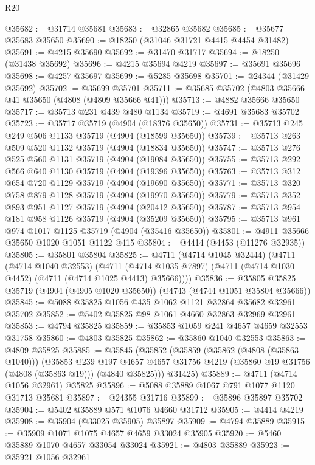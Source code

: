 \begin{lexlean}{R20}
\begin{coremodule}
@35682 := @31714 @35681
@35683 := @32865 @35682
@35685 := @35677 @35683 @35650
@35690 := @18250 (@31046 @31721 @4415 @4454 @31482)
@35691 := @4215 @35690
@35692 := @31470 @31717
@35694 := @18250 (@31438 @35692)
@35696 := @4215 @35694 @4219
@35697 := @35691 @35696
@35698 := @4257 @35697
@35699 := @5285 @35698
@35701 := @24344 (@31429 @35692)
@35702 := @35699 @35701
@35711 := @35685 @35702 (@4803 @35666 @41 @35650 (@4808 (@4809 @35666 @41)))
@35713 := @4882 @35666 @35650
@35717 := @35713 @231 @439 @480 @1134
@35719 := @4691 @35683 @35702
@35723 := @35717 @35719 (@4904 (@18376 @35650))
@35731 := @35713 @245 @249 @506 @1133 @35719 (@4904 (@18599 @35650))
@35739 := @35713 @263 @509 @520 @1132 @35719 (@4904 (@18834 @35650))
@35747 := @35713 @276 @525 @560 @1131 @35719 (@4904 (@19084 @35650))
@35755 := @35713 @292 @566 @640 @1130 @35719 (@4904 (@19396 @35650))
@35763 := @35713 @312 @654 @720 @1129 @35719 (@4904 (@19690 @35650))
@35771 := @35713 @320 @758 @879 @1128 @35719 (@4904 (@19970 @35650))
@35779 := @35713 @352 @893 @951 @1127 @35719 (@4904 (@20412 @35650))
@35787 := @35713 @954 @181 @958 @1126 @35719 (@4904 (@35209 @35650))
@35795 := @35713 @961 @974 @1017 @1125 @35719 (@4904 (@35416 @35650))
@35801 := @4911 @35666 @35650 @1020 @1051 @1122 @415
@35804 := @4414 (@4453 (@11276 @32935))
@35805 := @35801 @35804
@35825 := @4711
    (@4714 @1045 @32444)
    (@4711
      (@4714 @1040 @32553)
      (@4711 (@4714 @1035 @7897) (@4711 (@4714 @1030 @4452) (@4711 (@4714 @1025 @4413) @35666))))
@35836 := @35805 @35825 @35719 (@4904 (@4905 @1020 @35650)) (@4743 (@4744 @1051 @35804 @35666))
@35845 := @5088 @35825 @1056 @435 @1062 @1121 @32864 @35682 @32961 @35702
@35852 := @5402 @35825 @98 @1061 @4660 @32863 @32969 @32961
@35853 := @4794 @35825
@35859 := @35853 @1059 @241 @4657 @4659 @32553 @31758
@35860 := @4803 @35825
@35862 := @35860 @1040 @32553
@35863 := @4809 @35825
@35885 := @35845
    (@35852
      (@35859
        (@35862 (@4808 (@35863 @1040)))
        (@35853
          @239
          @197
          @4657
          @4657
          @31756
          @4219
          (@35860 @19 @31756 (@4808 (@35863 @19)))
          (@4840 @35825)))
      @31425)
@35889 := @4711 (@4714 @1056 @32961) @35825
@35896 := @5088 @35889 @1067 @791 @1077 @1120 @31713 @35681
@35897 := @24355 @31716
@35899 := @35896 @35897 @35702
@35904 := @5402 @35889 @571 @1076 @4660 @31712
@35905 := @4414 @4219
@35908 := @35904 (@33025 @35905) @35897
@35909 := @4794 @35889
@35915 := @35909 @1071 @1075 @4657 @4659 @33024 @35905
@35920 := @5460 @35889 @1070 @4657 @33054 @33024
@35921 := @4803 @35889
@35923 := @35921 @1056 @32961

\end{coremodule}
\end{lexlean}
